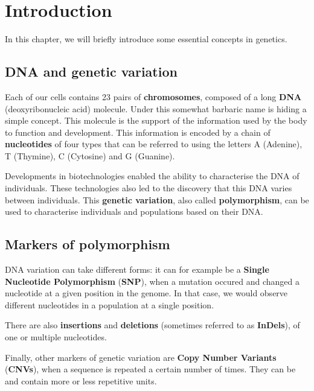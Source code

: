 \documentclass[
]{book}
\begin{document}
\hypertarget{introduction}{%
\chapter*{Introduction}\label{introduction}}

In this chapter, we will briefly introduce some essential concepts in genetics.

\hypertarget{dna-and-genetic-variation}{%
\section*{DNA and genetic variation}\label{dna-and-genetic-variation}}

Each of our cells contains 23 pairs of \textbf{chromosomes}, composed of a long \textbf{DNA}
(deoxyribonucleic acid) molecule. Under this somewhat barbaric name
is hiding a simple concept. This molecule is the support of the information
used by the body to function and development. This information is encoded by a
chain of \textbf{nucleotides} of four types that can be referred to using the letters
A (Adenine), T (Thymine), C (Cytosine) and G (Guanine).

Developments in biotechnologies enabled the ability to characterise the DNA of
individuals. These technologies also led to the discovery that this DNA varies
between individuals. This \textbf{genetic variation}, also called \textbf{polymorphism},
can be used to characterise individuals and populations based on their DNA.

\hypertarget{markers-of-polymorphism}{%
\section*{Markers of polymorphism}\label{markers-of-polymorphism}}

DNA variation can take different forms: it can for example be a
\textbf{Single Nucleotide Polymorphism} (\textbf{SNP}), when a mutation occured and changed a
nucleotide at a given position in the genome. In that case, we would observe
different nucleotides in a population at a single position.

There are also \textbf{insertions} and \textbf{deletions} (sometimes referred to as
\textbf{InDels}), of one or multiple nucleotides.

Finally, other markers of genetic variation are
\textbf{Copy Number Variants} (\textbf{CNVs}), when a sequence is repeated a certain number
of times. They can be and contain more or less repetitive units.
\end{document}
